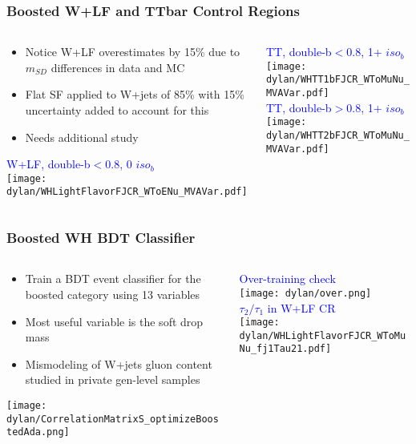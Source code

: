 \documentclass{beamer}
\begin{document}
\begin{frame}
  \frametitle{Boosted W+LF and TTbar Control Regions}

  \begin{columns}
    \begin{column}{0.55\linewidth}
      \begin{itemize}
      \item Notice W+LF overestimates by 15\% due to $m_{SD}$ differences in data and MC
      \item Flat SF applied to W+jets of 85\% with 15\% uncertainty added to account for this
      \item Needs additional study
      \end{itemize}
      \centering
      \textcolor{blue}{W+LF, double-b$< 0.8$, 0 $iso_b$} \\
      \texttt{[image: dylan/WHLightFlavorFJCR\_WToENu\_MVAVar.pdf]} \\
    \end{column}
    \begin{column}{0.45\linewidth}
      \centering
      \textcolor{blue}{TT, double-b$< 0.8$, 1+ $iso_b$} \\
      \texttt{[image: dylan/WHTT1bFJCR\_WToMuNu\_MVAVar.pdf]} \\
      \textcolor{blue}{TT, double-b$> 0.8$, 1+ $iso_b$} \\
      \texttt{[image: dylan/WHTT2bFJCR\_WToMuNu\_MVAVar.pdf]}    \end{column}
  \end{columns}

\end{frame}

\begin{frame}
  \frametitle{Boosted WH BDT Classifier}
  \begin{columns}
    \begin{column}{0.5\linewidth}
      \begin{itemize}
      \item Train a BDT event classifier for the boosted category using 13 variables
      \item Most useful variable is the soft drop mass
      \item Mismodeling of W+jets gluon content studied in private gen-level samples
      \end{itemize}
      \centering
      \texttt{[image: dylan/CorrelationMatrixS\_optimizeBoostedAda.png]}
    \end{column}
    \begin{column}{0.5\linewidth}
      \centering
      \textcolor{blue}{Over-training check} \\
      \texttt{[image: dylan/over.png]} \\
      \textcolor{blue}{$\tau_2/\tau_1$ in W+LF CR} \\
      \texttt{[image: dylan/WHLightFlavorFJCR\_WToMuNu\_fj1Tau21.pdf]} \\
    \end{column}
  \end{columns}
\end{frame}
\end{document}
